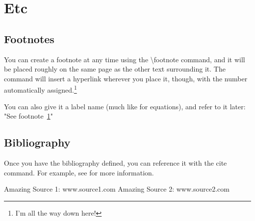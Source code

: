 \documentclass{article}
\begin{document}
\section{Etc}

    \subsection{Footnotes}
        You can create a footnote at any time using the \textbackslash footnote command, and it will be placed roughly on the same page as the other text surrounding it. The command will insert a hyperlink wherever you place it, though, with the number automatically assigned.\footnote{\label{myFootnoteName}I'm all the way down here!}
        
        You can also give it a label name (much like for equations), and refer to it later: "See footnote~\ref{myFootnoteName}"

    \newpage

    \subsection{Bibliography}
    Once you have the bibliography defined, you can reference it with the cite command. For example, see \cite{sourceName2} for more information.

\begin{thebibliography}{1}
     Amazing Source 1: www.source1.com
     Amazing Source 2: www.source2.com
\end{thebibliography}
\end{document}
